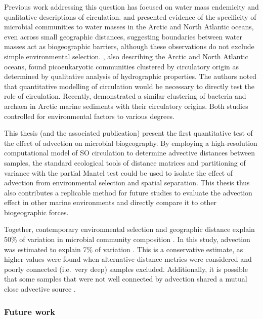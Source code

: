 Previous work addressing this question has focused on water mass endemicity and qualitative descriptions of circulation.
\citet{Galand:2009hy} and \citet{Agogue:2011fm} presented evidence of the specificity of microbial communities to water masses in the Arctic and North Atlantic oceans, even across small geographic distances, suggesting boundaries between water masses act as biogeographic barriers, although these observations do not exclude simple environmental selection.
\citet{Hamilton:2008tp}, also describing the Arctic and North Atlantic oceans, found picoeukaryotic communities clustered by circulatory origin as determined by qualitative analysis of hydrographic properties.
The authors noted that quantitative modelling of circulation would be necessary to directly test the role of circulation.
Recently, \citet{Hamdan:2013ko} demonstrated a similar clustering of bacteria and archaea in Arctic marine sediments with their circulatory origins.
Both studies controlled for environmental factors to various degrees.

This thesis (and the associated publication) present the first quantitative test of the effect of advection on microbial biogeography.
By employing a high-resolution computational model of \ac{SO} circulation to determine advective distances between samples, the standard ecological tools of distance matrices and partitioning of variance with the partial Mantel test could be used to isolate the effect of advection from environmental selection and spatial separation.
This thesis thus also contributes a replicable method for future studies to evaluate the advection effect in other marine environments and directly compare it to other biogeographic forces.



Together, contemporary environmental selection and geographic distance explain \textapprox{} 50\% of variation in microbial community composition \cite{Hanson:2012cb}.
In this study, advection was estimated to explain 7\% of variation .
This is a conservative estimate, as higher values were found when alternative distance metrics were considered and poorly connected (i.e.\ very deep) samples excluded.
Additionally, it is possible that some samples that were not well connected by advection shared a mutual close advective source .

\subsubsection{Future work}

